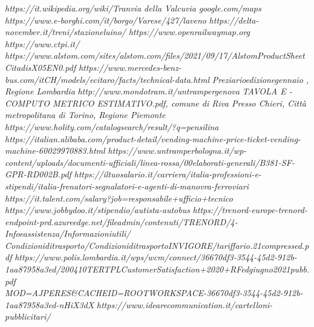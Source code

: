 \documentclass{article}
\begin{document}
\begin{thebibliography}{99}
\textit{https://it.wikipedia.org/wiki/Tranvia della Valcuvia}
\textit{google.com/maps}
\textit{https://www.e-borghi.com/it/borgo/Varese/427/laveno}
\textit{https://delta-november.it/treni/stazione\textunderscore luino/}
\textit{https://www.openrailwaymap.org}
\textit{https://www.ctpi.it/}
\textit{https://www.alstom.com/sites/alstom.com/files/2021/09/17/Alstom\textunderscore Product\textunderscore Sheet\textunderscore Citadis\textunderscore X05\textunderscore EN\textunderscore0.pdf}
\textit{https://www.mercedes-benz-bus.com/it\textunderscore CH/models/ecitaro/facts/technical-data.html}
\textit{Preziario\textunderscore edizione\textunderscore gennaio , Regione Lombardia}
\textit{http://www.mondotram.it/un\textunderscore tram\textunderscore per\textunderscore genova}
\textit{TAVOLA E - COMPUTO METRICO ESTIMATIVO.pdf, comune di Riva Presso Chieri, Città metropolitana di Torino, Regione Piemonte}
\textit{https://www.holity.com/catalogsearch/result/?q=pensilina }
\textit{https://italian.alibaba.com/product-detail/vending-machine-price-ticket-vending-machine-60029970883.html }
\textit{https://www.untramperbologna.it/wp-content/uploads/documenti-ufficiali/linea-rossa/00\textunderscore elaborati-generali/B381-SF-GPR-RD002B.pdf}
\textit{https://iltuosalario.it/carriera/italia-professioni-e-stipendi/italia-frenatori-segnalatori-e-agenti-di-manovra-ferroviari}
\textit{https://it.talent.com/salary?job=responsabile+ufficio+tecnico}
\textit{https://www.jobbydoo.it/stipendio/autista-autobus}
\textit{https://trenord-europe-trenord-endpoint-prd.azureedge.net/fileadmin/contenuti/TRENORD/4-Info\textunderscore e\textunderscore assistenza/Informazioni\textunderscore utili/\\
Condizioni\textunderscore di\textunderscore trasporto/Condizioni\textunderscore di\textunderscore trasporto\textunderscore IN\textunderscore VIGORE\textunderscore/tariffario.21\textunderscore compressed.pdf }
\textit{https://www.polis.lombardia.it/wps/wcm/connect/36670df3-3544-45d2-912b-1aa87958a3ed/200410TER\textunderscore TPL\textunderscore CustomerSatisfaction+2020+RF\textunderscore edgiugno2021\textunderscore pubb.pdf\\
MOD=AJPERES\&CACHEID=ROOTWORKSPACE-36670df3-3544-45d2-912b-1aa87958a3ed-nHiX3dX }
\textit{https://www.idearecommunication.it/cartelloni-pubblicitari/}





\end{thebibliography}
\end{document}
